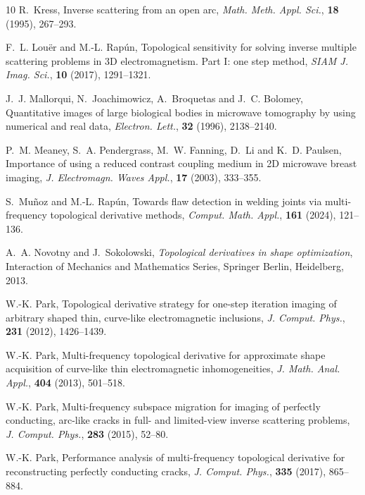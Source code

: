 \documentclass[a4,10pt]{article}
\theoremstyle{plain}
\theoremstyle{remark}
\begin{document}
\begin{thebibliography}{10}
\newblock R.~Kress,
\newblock Inverse scattering from an open arc,
\newblock \emph{Math. Meth. Appl. Sci.}, \textbf{18} (1995), 267--293.

\newblock F.~L. Lou{\"e}r and M.-L. Rap{\'u}n,
\newblock Topological sensitivity for solving inverse multiple scattering
  problems in 3{D} electromagnetism. {P}art {I}: one step method,
\newblock \emph{SIAM J. Imag. Sci.}, \textbf{10} (2017), 1291--1321.

\newblock J.~J. Mallorqui, N.~Joachimowicz, A.~Broquetas and J.~C. Bolomey,
\newblock Quantitative images of large biological bodies in microwave
  tomography by using numerical and real data,
\newblock \emph{Electron. Lett.}, \textbf{32} (1996), 2138--2140.

\newblock P.~M. Meaney, S.~A. Pendergrass, M.~W. Fanning, D.~Li and K.~D.
  Paulsen,
\newblock Importance of using a reduced contrast coupling medium in 2{D}
  microwave breast imaging,
\newblock \emph{J. Electromagn. Waves Appl.}, \textbf{17} (2003), 333--355.

\newblock S.~Mu{\~n}oz and M.-L. Rap{\'u}n,
\newblock Towards flaw detection in welding joints via multi-frequency
  topological derivative methods,
\newblock \emph{Comput. Math. Appl.}, \textbf{161} (2024), 121--136.

\newblock A.~A. Novotny and J.~Sokolowski,
\newblock \emph{Topological derivatives in shape optimization},
\newblock Interaction of Mechanics and Mathematics Series, Springer Berlin,
  Heidelberg, 2013.

\newblock W.-K. Park,
\newblock Topological derivative strategy for one-step iteration imaging of
  arbitrary shaped thin, curve-like electromagnetic inclusions,
\newblock \emph{J. Comput. Phys.}, \textbf{231} (2012), 1426--1439.

\newblock W.-K. Park,
\newblock Multi-frequency topological derivative for approximate shape
  acquisition of curve-like thin electromagnetic inhomogeneities,
\newblock \emph{J. Math. Anal. Appl.}, \textbf{404} (2013), 501--518.

\newblock W.-K. Park,
\newblock Multi-frequency subspace migration for imaging of perfectly
  conducting, arc-like cracks in full- and limited-view inverse scattering
  problems,
\newblock \emph{J. Comput. Phys.}, \textbf{283} (2015), 52--80.

\newblock W.-K. Park,
\newblock Performance analysis of multi-frequency topological derivative for
  reconstructing perfectly conducting cracks,
\newblock \emph{J. Comput. Phys.}, \textbf{335} (2017), 865--884.


\end{thebibliography}
\end{document}
